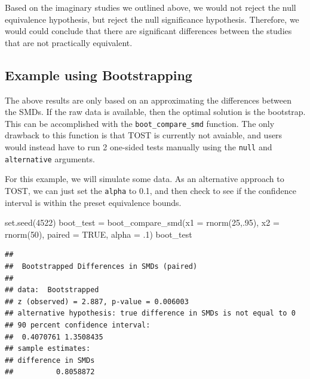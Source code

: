 \documentclass[]{interact}
\theoremstyle{plain}%
\theoremstyle{definition}
\theoremstyle{remark}
\newenvironment{Shaded}{\begin{snugshade}}{\end{snugshade}}
\newcommand{\AttributeTok}[1]{\textcolor[rgb]{0.77,0.63,0.00}{#1}}
\newcommand{\ConstantTok}[1]{\textcolor[rgb]{0.00,0.00,0.00}{#1}}
\newcommand{\DecValTok}[1]{\textcolor[rgb]{0.00,0.00,0.81}{#1}}
\newcommand{\FunctionTok}[1]{\textcolor[rgb]{0.00,0.00,0.00}{#1}}
\newcommand{\NormalTok}[1]{#1}
\newcommand{\OtherTok}[1]{\textcolor[rgb]{0.56,0.35,0.01}{#1}}
\begin{document}
Based on the imaginary studies we outlined above, we would not reject
the null equivalence hypothesis, but reject the null significance
hypothesis. Therefore, we would could conclude that there are
significant differences between the studies that are not practically
equivalent.

\hypertarget{example-using-bootstrapping}{%
\subsection{Example using
Bootstrapping}\label{example-using-bootstrapping}}

The above results are only based on an approximating the differences
between the SMDs. If the raw data is available, then the optimal
solution is the bootstrap. This can be accomplished with the
\texttt{boot\_compare\_smd} function. The only drawback to this function
is that TOST is currently not avaiable, and users would instead have to
run 2 one-sided tests manually using the \texttt{null} and
\texttt{alternative} arguments.

For this example, we will simulate some data. As an alternative approach
to TOST, we can just set the \texttt{alpha} to 0.1, and then check to
see if the confidence interval is within the preset equivalence bounds.

\begin{Shaded}
\begin{Highlighting}[]
\FunctionTok{set.seed}\NormalTok{(}\DecValTok{4522}\NormalTok{)}
\NormalTok{boot\_test }\OtherTok{=} \FunctionTok{boot\_compare\_smd}\NormalTok{(}\AttributeTok{x1 =} \FunctionTok{rnorm}\NormalTok{(}\DecValTok{25}\NormalTok{,.}\DecValTok{95}\NormalTok{), }\AttributeTok{x2 =} \FunctionTok{rnorm}\NormalTok{(}\DecValTok{50}\NormalTok{), }
                             \AttributeTok{paired =} \ConstantTok{TRUE}\NormalTok{, }\AttributeTok{alpha =}\NormalTok{ .}\DecValTok{1}\NormalTok{)}
\NormalTok{boot\_test}
\end{Highlighting}
\end{Shaded}

\begin{verbatim}
## 
##  Bootstrapped Differences in SMDs (paired)
## 
## data:  Bootstrapped
## z (observed) = 2.887, p-value = 0.006003
## alternative hypothesis: true difference in SMDs is not equal to 0
## 90 percent confidence interval:
##  0.4070761 1.3508435
## sample estimates:
## difference in SMDs 
##          0.8058872
\end{verbatim}
\end{document}
